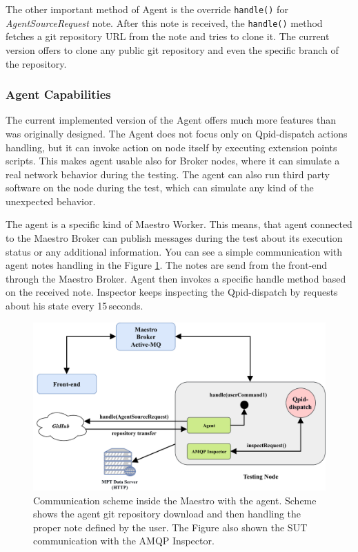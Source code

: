 The other important method of Agent is the override \texttt{handle()} for \emph{AgentSourceRequest} note. After this note is received, the \texttt{handle()} method fetches a git repository URL from the note and tries to clone it. The current version offers to clone any public git repository and even the specific branch of the repository.

\subsubsection*{Agent Capabilities}
\label{Agent Capabilities}
The current implemented version of the Agent offers much more features than was originally designed. The Agent does not focus only on Qpid-dispatch actions handling, but it can invoke action on node itself by executing extension points scripts. This makes agent usable also for Broker nodes, where it can simulate a real network behavior during the testing. The agent can also run third party software on the node during the test, which can simulate any kind of  the unexpected behavior.

The agent is a specific kind of Maestro Worker. This means, that agent connected to the Maestro Broker can publish messages during the test about its execution status or any additional information. You can see a simple communication with agent notes handling in the Figure \ref{fig:agent_demo}. The notes are send from the front-end through the Maestro Broker. Agent then invokes a specific handle method based on the received note. Inspector keeps inspecting the Qpid-dispatch by requests about his state every 15\,seconds.

\begin{figure}[H]
  \centering
  \includegraphics[width=15cm]{obrazky-figures/agent_demo.pdf}
  \caption{Communication scheme inside the Maestro with the agent. Scheme shows the agent git repository download and then handling the proper note defined by the user. The Figure also shown the SUT communication with the AMQP Inspector.}
  \label{fig:agent_demo}
\end{figure}

